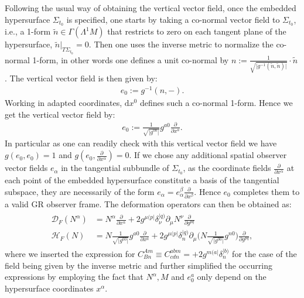 Following the usual way of obtaining the vertical vector field, once the embedded hypersurface $\Sigma_{t_0}$ is specified, one starts by taking a co-normal vector field to $\Sigma_{t_0}$, i.e., a 1-form $\tilde{n} \in \Gamma(\Lambda^1M)$ that restricts to zero on each tangent plane of the hypersurface, $\tilde{n} \vert_{T\Sigma_{t_0}} = 0$. Then one uses the inverse metric to normalize the co-normal 1-form, in other words one defines a unit co-normal by $n := \frac{1}{\sqrt{ \vert g^{-1}(\tilde{n},\tilde{n}) \vert }} \cdot \tilde{n}$. The vertical vector field is then given by: 
\begin{align}
e_0 := g^{-1}(n, - ). 
\end{align}
Working in adapted coordinates, $\mathrm{d}x^0$ defines such a co-normal 1-form. Hence we get the vertical vector field by: 
\begin{align}
e_0 := \frac{1}{\sqrt{\vert g^{00} \vert }} g^{a0} \frac{\partial}{\partial x^a}.
\end{align}
In particular as one can readily check with this vertical vector field we have $g(e_0,e_0) = 1$ and $g(e_0,\frac{\partial}{\partial x^{\alpha}}) = 0$. If we chose any additional spatial observer vector fields $e_{\alpha}$ in the tangential subbundle of $\Sigma_{t_0}$, as the coordinate fields $\frac{\partial}{\partial x^{\alpha}}$ at each point of the embedded hypersurface constitute a basis of the tangential subspace, they are necessarily of the form $e_{\alpha} = e_{\alpha}^{\beta} \frac{\partial}{\partial x^{\beta}}$. Hence $e_0$ completes them to a valid GR observer frame.
The deformation operators can then be obtained as:
\begin{align}
    \begin{aligned}
    \mathcal{D}_F(N^{\alpha}) &= N^{\alpha} \frac{\partial}{\partial x^{\alpha}} + 2 g^{\mu (p\vert} \delta^{\vert q)}_{\nu} \partial_{\mu} N^{\nu} \frac{\partial}{\partial g ^{pq}} \\
    \mathcal{H}_F(N) &= N \frac{1}{\sqrt{\vert g^{00} \vert }} g^{a0} \frac{\partial}{\partial x^a} +2 g^{\mu (p\vert} \delta^{\vert q)}_{n} \partial_{\mu} \biggl (N \frac{1}{\sqrt{\vert g^{00} \vert }} g^{n0} \biggr )  \frac{\partial}{\partial g ^{pq}},
    \end{aligned}
\end{align}
where we inserted the expression for $C^{Am}_{Bn} \equiv C^{abm}_{cdn} = +2g^{m(a\vert}\delta^{\vert b)}_n$ for the case of the field being given by the inverse metric and further simplified the occurring expressions by employing the fact that $N^{\alpha},M$ and $e_0^a$ only depend on the hypersurface coordinates $x^\alpha$.

